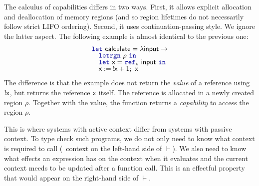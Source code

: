 The calculus of capabilities differs in two ways. First, it allows explicit allocation and deallocation
of memory regions (and so region lifetimes do not necessarily follow strict LIFO ordering). Second, 
it uses continuation-passing style. We ignore the latter aspect. The following example is almost 
identical to the previous one:
%
\begin{equation*}
\begin{array}{l}
\kvd{let}~\ident{calculate} = \lambda \ident{input} \rightarrow\\[-0.25em]
\quad \kvd{letrgn}~\rho~\kvd{in}\\[-0.25em]
\quad \kvd{let}~\ident{x} = \kvd{ref}_\rho ~\ident{input}~\kvd{in}\\[-0.25em]
\quad \ident{x} :=\, !\ident{x} + 1;~ \ident{x}
\end{array}
\end{equation*}
%
The difference is that the example does not return the \emph{value} of a reference using 
$!\textnormal{\sffamily x}$, but returns the reference $\textnormal{\sffamily x}$ itself. The reference is allocated in a newly 
created region $\rho$. Together with the value, the function returns a \emph{capability} to access 
the region $\rho$.

This is where systems with active context differ from systems with passive context. To type check 
such programs, we do not only need to know what context is required to call 
(\ie~context on the left-hand side of $\vdash$). We also need to know what effects an expression
has on the context when it evaluates and the current context meeds to be updated after a function 
call. This is an effectful property that would appear on the right-hand side of $\vdash$.

